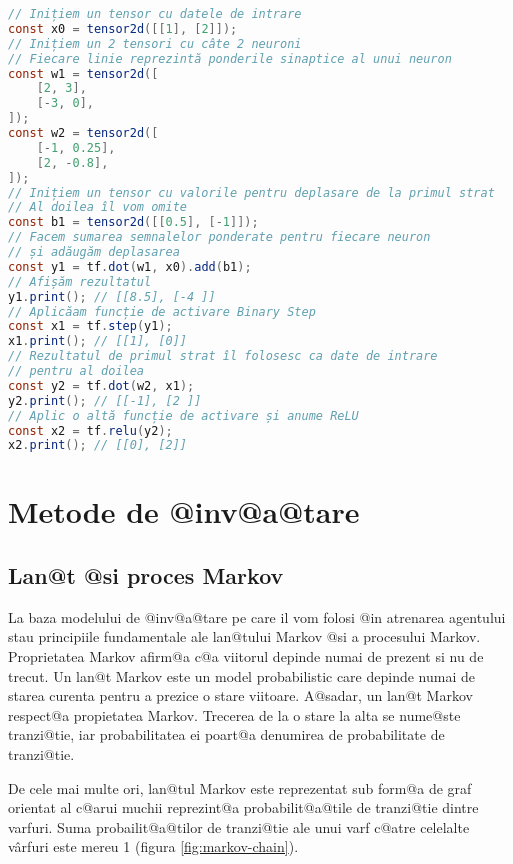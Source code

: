 \begin{lstlisting}[language=Java, caption=Exemple de folosire a bibliotecii Tensorflow, label={lst:exemple-tensor-nn}]
// Inițiem un tensor cu datele de intrare
const x0 = tensor2d([[1], [2]]);
// Inițiem un 2 tensori cu câte 2 neuroni
// Fiecare linie reprezintă ponderile sinaptice al unui neuron
const w1 = tensor2d([
    [2, 3],
    [-3, 0],
]);
const w2 = tensor2d([
    [-1, 0.25],
    [2, -0.8],
]);
// Inițiem un tensor cu valorile pentru deplasare de la primul strat
// Al doilea îl vom omite
const b1 = tensor2d([[0.5], [-1]]);
// Facem sumarea semnalelor ponderate pentru fiecare neuron
// și adăugăm deplasarea
const y1 = tf.dot(w1, x0).add(b1);
// Afișăm rezultatul
y1.print(); // [[8.5], [-4 ]]
// Aplicăam funcție de activare Binary Step
const x1 = tf.step(y1);
x1.print(); // [[1], [0]]
// Rezultatul de primul strat îl folosesc ca date de intrare
// pentru al doilea
const y2 = tf.dot(w2, x1);
y2.print(); // [[-1], [2 ]]
// Aplic o altă funcție de activare și anume ReLU
const x2 = tf.relu(y2);
x2.print(); // [[0], [2]]
\end{lstlisting}

\chapter{Metode de @inv@a@tare}

\section{Lan@t @si proces Markov}


La baza modelului de @inv@a@tare pe care il vom folosi @in atrenarea agentului stau principiile fundamentale ale lan@tului Markov @si a procesului Markov.
Proprietatea Markov afirm@a c@a viitorul depinde numai de prezent si nu de trecut. Un lan@t Markov este un model pro\-ba\-bi\-lis\-tic care depinde numai de starea curenta pentru a prezice o stare viitoare. A@sadar, un lan@t Markov respect@a propietatea Markov.
Trecerea de la o stare la alta se nume@ste tranzi@tie, iar probabilitatea ei poart@a denumirea de probabilitate de tranzi@tie.

De cele mai multe ori, lan@tul Markov este reprezentat sub form@a de graf orientat al c@arui muchii reprezint@a probabilit@a@tile de tranzi@tie dintre varfuri. Suma probailit@a@tilor de tranzi@tie ale unui varf c@atre celelalte v\^ arfuri este mereu 1 (figura \ref{fig:markov-chain}).

